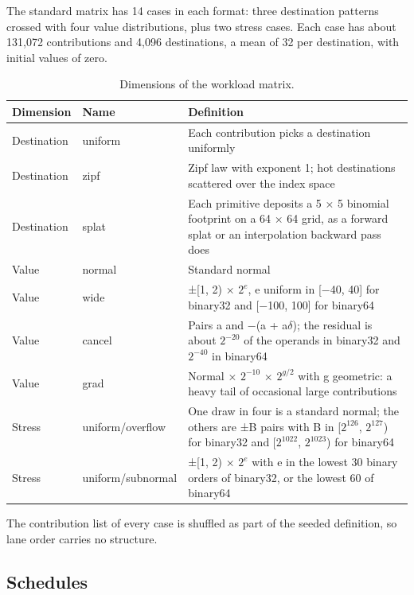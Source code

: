 \documentclass[3p,10pt]{elsarticle}
\begin{document}
The standard matrix has 14 cases in each format: three destination
patterns crossed with four value distributions, plus two stress cases.
Each case has about 131,072 contributions and 4,096 destinations, a mean
of 32 per destination, with initial values of zero.

\begin{table}[!htbp]\centering\small\setlength{\tabcolsep}{4pt}
\caption{Dimensions of the workload matrix.}\label{tab:9}
\begin{tabularx}{\linewidth}{>{\raggedright\arraybackslash\hsize=0.608\hsize}X>{\raggedright\arraybackslash\hsize=0.851\hsize}X>{\raggedright\arraybackslash\hsize=1.541\hsize}X}
\toprule
Dimension & Name & Definition \\
\midrule
Destination & uniform & Each contribution picks a destination uniformly \\
Destination & zipf & Zipf law with exponent 1; hot destinations scattered over the index
space \\
Destination & splat & Each primitive deposits a 5 × 5 binomial footprint on a 64 × 64 grid, as
a forward splat or an interpolation backward pass does \\
Value & normal & Standard normal \\
Value & wide & ±{[}1, 2) × \(2^e\), e uniform in {[}−40, 40{]} for binary32 and
{[}−100, 100{]} for binary64 \\
Value & cancel & Pairs a and −(a + a$\delta$); the residual is about \(2^{-20}\) of the operands
in binary32 and \(2^{-40}\) in binary64 \\
Value & grad & Normal × \(2^{-10}\) × \(2^{g/2}\) with g geometric: a heavy tail of
occasional large contributions \\
Stress & uniform/overflow & One draw in four is a standard normal; the others are ±B pairs with B in
{[}\(2^{126}\), \(2^{127}\)) for binary32 and {[}\(2^{1022}\),
\(2^{1023}\)) for binary64 \\
Stress & uniform/subnormal & ±{[}1, 2) × \(2^e\) with e in the lowest 30 binary orders of binary32,
or the lowest 60 of binary64 \\
\bottomrule
\end{tabularx}
\end{table}

The contribution list of every case is shuffled as part of the seeded
definition, so lane order carries no structure.

\hypertarget{schedules}{%
\subsection{Schedules}\label{schedules}}
\end{document}
